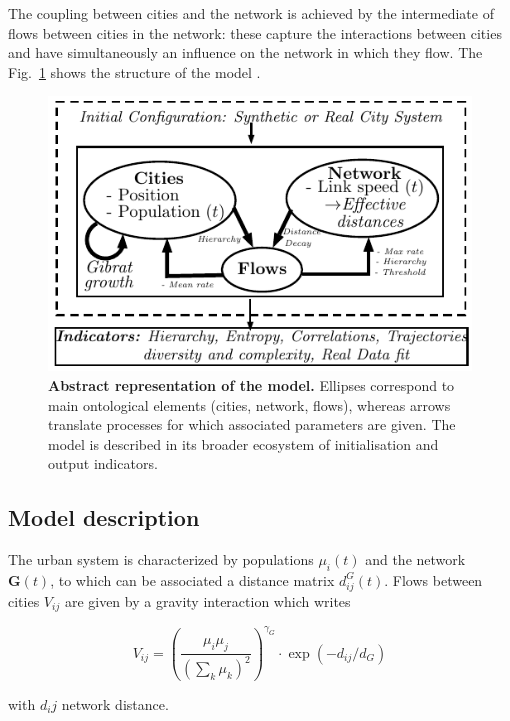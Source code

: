 The coupling between cities and the network is achieved by the intermediate of flows between cities in the network: these capture the interactions between cities and have simultaneously an influence on the network in which they flow. The Fig.~\ref{fig:macrocoevol:model} shows the structure of the model .


\begin{figure}
\includegraphics[width=\linewidth]{figures/model}
\caption{\textbf{Abstract representation of the model.} Ellipses correspond to main ontological elements (cities, network, flows), whereas arrows translate processes for which associated parameters are given. The model is described in its broader ecosystem of initialisation and output indicators.\label{fig:macrocoevol:model}}
\end{figure}


\subsection{Model description}

The urban system is characterized by populations $\mu_i(t)$ and the network $\mathbf{G}(t)$, to which can be associated a distance matrix $d^G_{ij}(t)$. Flows between cities $V_{ij}$ are given by a gravity interaction which writes

\begin{equation}
V_{ij} = \left(\frac{\mu_i\mu_j}{\left(\sum_k{\mu_k}\right)^2}\right)^{\gamma_G}\cdot \exp{\left(-d_{ij}/d_G\right)}
\end{equation}

with $d_ij$ network distance.

